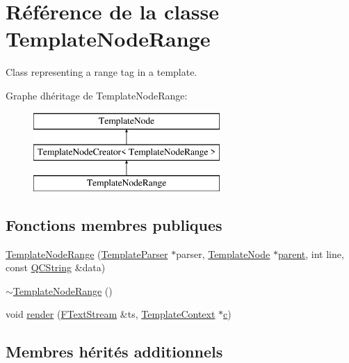 \hypertarget{class_template_node_range}{}\section{Référence de la classe Template\+Node\+Range}
\label{class_template_node_range}


Class representing a \textquotesingle{}range\textquotesingle{} tag in a template.  


Graphe d\textquotesingle{}héritage de Template\+Node\+Range\+:\begin{figure}[H]
\begin{center}
\leavevmode
\includegraphics[height=3.000000cm]{class_template_node_range}
\end{center}
\end{figure}
\subsection*{Fonctions membres publiques}
\begin{DoxyCompactItemize}
\item 
\hyperlink{class_template_node_range_a7d5a86369700e268fca471f7a3277f8b}{Template\+Node\+Range} (\hyperlink{class_template_parser}{Template\+Parser} $\ast$parser, \hyperlink{class_template_node}{Template\+Node} $\ast$\hyperlink{class_template_node_a69a306ef84e62af9fe57bf9aacc94536}{parent}, int line, const \hyperlink{class_q_c_string}{Q\+C\+String} \&data)
\item 
\hyperlink{class_template_node_range_a9bb1c6f3d6a839dea8f0230607bc5f2a}{$\sim$\+Template\+Node\+Range} ()
\item 
void \hyperlink{class_template_node_range_ad0b18f4c88b8716442c8cd9e868d7815}{render} (\hyperlink{class_f_text_stream}{F\+Text\+Stream} \&ts, \hyperlink{class_template_context}{Template\+Context} $\ast$\hyperlink{060__command__switch_8tcl_ab14f56bc3bd7680490ece4ad7815465f}{c})
\end{DoxyCompactItemize}
\subsection*{Membres hérités additionnels}


